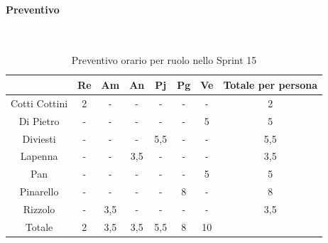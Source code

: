 \documentclass{article}
\begin{document}
                \paragraph{Preventivo}\mbox{}\\
                \begin{table}[H]
                    \centering
                    \begin{tabular}{|c|c|c|c|c|c|c|c|}
                    \hline
                                  & Re  & Am  & An  & Pj  & Pg  & Ve  & Totale per persona \\ \hline
                    Cotti Cottini & 2   & -   & -   & -   & -   & -   & 2                  \\ \hline
                    Di Pietro     & -   & -   & -   & -   & -   & 5   & 5                  \\ \hline
                    Diviesti      & -   & -   & -   & 5,5 & -   & -   & 5,5                \\ \hline
                    Lapenna       & -   & -   & 3,5 & -   & -   & -   & 3,5                \\ \hline
                    Pan           & -   & -   & -   & -   & -   & 5   & 5                  \\ \hline
                    Pinarello     & -   & -   & -   & -   & 8  & -   & 8                 \\ \hline
                    Rizzolo       & -   & 3,5 & -   & -   & -   & -   & 3,5                \\ \hline
                    Totale        & 2   & 3,5 & 3,5 & 5,5 & 8  & 10  &                    \\ \hline
                    \end{tabular}
                    \caption{Preventivo orario per ruolo nello Sprint 15}
                \end{table}

\end{document}
